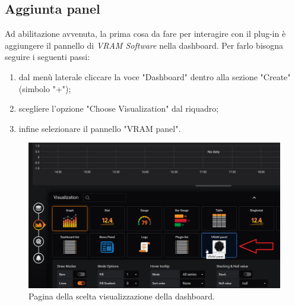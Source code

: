     \subsection{Aggiunta panel}
        Ad abilitazione avvenuta, la prima cosa da fare per interagire con il plug-in è aggiungere il pannello di \textit{VRAM Software} nella dashboard\glo. Per farlo bisogna seguire i seguenti passi:
        \begin{enumerate}
            \item dal menù laterale cliccare la voce "Dashboard" dentro alla sezione "Create" (simbolo "+");
            \item scegliere l'opzione "Choose Visualization" dal riquadro;
            \item infine selezionare il pannello "VRAM panel".
        \end{enumerate}
        \begin{figure}[H]
            \includegraphics[width=\textwidth,height=\textheight,keepaspectratio]{img/aggiunta_plug-in.png}
            \caption{Pagina della scelta visualizzazione della dashboard\glo.}
        \end{figure}
